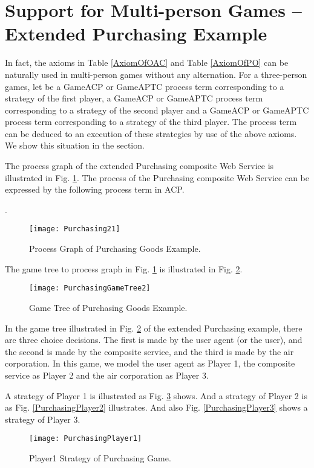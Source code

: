 \documentclass{fac}
\begin{document}
\section{Support for Multi-person Games -- Extended Purchasing Example}

In fact, the axioms in Table \ref{AxiomOfOAC} and Table \ref{AxiomOfPO} can be naturally used in multi-person games without any alternation. For a three-person games, let  be a GameACP or GameAPTC process term corresponding to a strategy of the first player,  a GameACP or GameAPTC process term corresponding to a strategy of the second player and  a GameACP or GameAPTC process term corresponding to a strategy of the third player. The process term  can be deduced to an execution of these strategies by use of the above axioms. We show this situation in the section.

The process graph of the extended Purchasing composite Web Service is illustrated in Fig. \ref{Purchasing21}. The process of the Purchasing composite Web Service can be expressed by the following process term in ACP.

.

\begin{figure}
  \centering
\texttt{[image: Purchasing21]}
  \caption{Process Graph of Purchasing Goods Example.}
  \label{Purchasing21}
\end{figure}

The game tree to process graph in Fig. \ref{Purchasing21} is illustrated in Fig. \ref{PurchasingGameTree2}.

\begin{figure}
  \centering
\texttt{[image: PurchasingGameTree2]}
  \caption{Game Tree of Purchasing Goods Example.}
  \label{PurchasingGameTree2}
\end{figure}

In the game tree illustrated in Fig. \ref{PurchasingGameTree2} of the extended Purchasing example, there are three choice decisions. The first is made by the user agent (or the user), and the second is made by the composite service, and the third is made by the air corporation. In this game, we model the user agent as Player 1, the composite service as Player 2 and the air corporation as Player 3.

A strategy of Player 1 is illustrated as Fig. \ref{PurchasingPlayer1} shows. And a strategy of Player 2 is as Fig. \ref{PurchasingPlayer2} illustrates. And also Fig. \ref{PurchasingPlayer3} shows a strategy of Player 3.

\begin{figure}
  \centering
\texttt{[image: PurchasingPlayer1]}
  \caption{Player1 Strategy of Purchasing Game.}
  \label{PurchasingPlayer1}
\end{figure}
\end{document}
